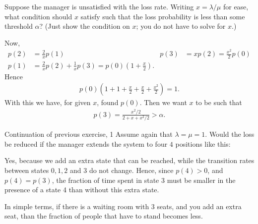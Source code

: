 \begin{exercise}[201807]  
Suppose the manager is unsatisfied with the loss rate. Writing $x=\lambda/\mu$ for ease, what condition should $x$ satisfy such that the loss probability is less than some threshold $\alpha$? (Just show the condition on $x$; you do not have to solve for $x$.) 
\begin{solution}
    Now, 
    \begin{align*}
      p(2) &= \frac 2 x p(1) & p(3) &= x p(2)= \frac{x^2}2 p(0) \\
p(1)&=\frac 2 x p(2) + \frac 1 x p(3) = p(0)(1+\frac x 2).
    \end{align*}
Hence
\begin{align*}
  p(0) (1+1 + \frac x 2 + \frac x 2 + \frac{x^2} 2)  =1.
\end{align*}
With this we have, for given $x$, found $p(0)$. Then we want $x$ to be such that
\begin{align*}
 p(3) = \frac{x^2/2}{2 + x + x^2/2} > \alpha.
\end{align*}

\end{solution}
\end{exercise}


\begin{exercise}[201807]{Continuation of previous exercise, 1}
 Assume again that $\lambda=\mu=1$. Would the loss be reduced if the manager extends the system to four $4$ positions like this:
\begin{center}
\end{center}
\begin{solution}
Yes, because we add an extra state that can be reached, while the transition rates between states $0, 1, 2$ and $3$ do not change. Hence, since $p(4)>0$, and $p(4)=p(3)$, the fraction of time spent in state 3 must be smaller in the presence of a state 4 than without this extra state. 

In simple terms, if there is a waiting room with 3 seats, and you add an extra seat, than the fraction of people that have to stand becomes less. 
\end{solution}
\end{exercise}


